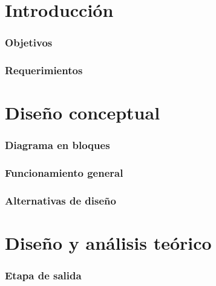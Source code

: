 \documentclass[10pt,a4paper]{article}
\begin{document}
		
	\setcounter{page}{1}

	\part{Introducción}\label{part:intro}

		\section{Objetivos}\label{sec:obj}
			

		\section{Requerimientos}\label{sec:req}
			

	\part{Diseño conceptual}\label{part:concept}

		\section{Diagrama en bloques}\label{sec:bloques}
			

		\section{Funcionamiento general}\label{sec:func_gral} %
			

		\section{Alternativas de diseño}\label{sec:alt}
			

	\part{Diseño y análisis teórico}\label{part:teo}

		\section{Etapa de salida}
			
\end{document}
